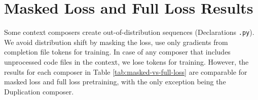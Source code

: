 \section{Masked Loss and Full Loss Results}
\label{appendix:masked-vs-full}

Some context composers create out-of-distribution sequences (\eg Declarations \texttt{.py}). We avoid distribution shift by masking the loss, \ie use only gradients from completion file tokens for training. In case of any composer that includes unprocessed code files in the context, we lose tokens for training. However, the results for each composer in Table \ref{tab:masked-vs-full-loss} are comparable for masked loss and full loss pretraining, with the only exception being the Duplication composer.


